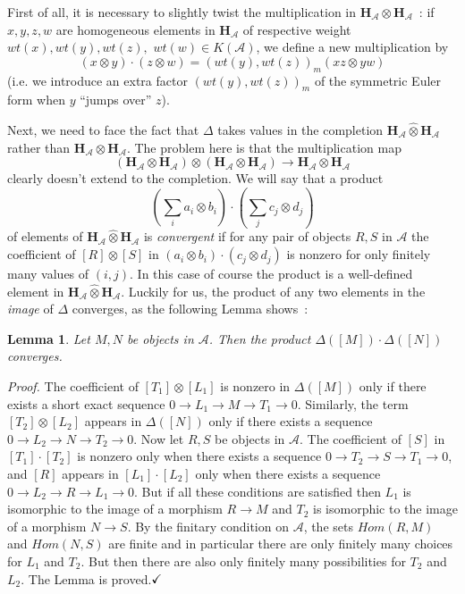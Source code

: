 \documentclass[a4paper,10pt]{amsart}
\def\H{\mathbf{H}}
\def\qed{$\hfill \checkmark$}
\def\A{\mathcal{A}}
\newtheorem{lem}[theo]{Lemma}
\numberwithin{equation}{section}
\begin{document}
\vspace{.1in}

First of all, it is necessary to slightly twist the multiplication in $\H_{\A} \otimes \H_{\A}$~: if $x, y, z, w$ are homogeneous elements in $\H_{\A}$ of respective weight $wt(x), wt(y), wt(z),$ $wt(w) \in K(\A)$, we define a new multiplication by
$$(x \otimes y) \cdot (z \otimes w)=( wt(y), wt(z))_m (xz \otimes yw)$$
(i.e. we introduce an extra factor $(wt(y), wt(z))_m$ of the symmetric Euler form when
$y$ ``jumps over'' $z$).

Next, we need to face the fact that $\Delta$ takes values in the completion $\H_{\A} \widehat{\otimes} \H_{\A}$ rather than $\H_{\A} \otimes \H_{\A}$. The problem here is that the multiplication map
$$(\H_{\A} \otimes \H_{\A}) \otimes (\H_{\A} \otimes \H_{\A}) \to \H_{\A} \otimes \H_{\A}$$
clearly doesn't extend to the completion. We will say that a product
$$(\sum_i a_i \otimes b_i)\cdot (\sum_j c_j \otimes d_j)$$
 of elements of $\H_{\A} \widehat{\otimes} \H_{\A}$ is \textit{convergent} if for any pair of objects $R,S$ in $\A$ the coefficient of $[R] \otimes [S]$ in
$(a_i \otimes b_i) \cdot (c_j \otimes d_j)$ is nonzero for only finitely many values of $(i,j)$. In this case of course the product is a well-defined element in $\H_{\A} \widehat{\otimes} \H_{\A}$.
Luckily for us, the product of any two elements in the \textit{image} of $\Delta$ converges, as the following Lemma shows~:

\begin{lem}\label{L:deltaextends} Let $M, N$ be objects in $\A$. Then the product $\Delta([M]) \cdot \Delta([N])$ converges.\end{lem}
\noindent
\textit{Proof.} The coefficient of $[T_1] \otimes [L_1]$ is nonzero in $\Delta([M])$ only if there exists a short exact sequence $0 \to L_1 \to M \to T_1 \to 0$. Similarly, the term $[T_2] \otimes [L_2]$ appears in $\Delta([N])$ only if there exists a sequence $0 \to L_2 \to N \to T_2\to 0$. Now let $R,S$ be objects in $\A$. The coefficient of $[S]$ in $[T_1]\cdot [T_2]$ is nonzero only when there exists a sequence
$0 \to T_2 \to S \to T_1 \to 0$, and $[R]$ appears in $[L_1] \cdot [L_2]$ only when there exists a sequence $0 \to L_2 \to R \to L_1 \to 0$. But if all these conditions are satisfied then $L_1$ is isomorphic to the image of a morphism $R \to M$ and $T_2$ is isomorphic to the image of a morphism $N \to S$. By the finitary condition on $\A$, the sets ${Hom}(R,M)$ and ${Hom}(N,S)$ are finite and in particular there are only finitely many choices for $L_1$ and $T_2$. But then there are also only finitely many possibilities for $T_2$ and $L_2$. The Lemma is proved.\qed
\end{document}
